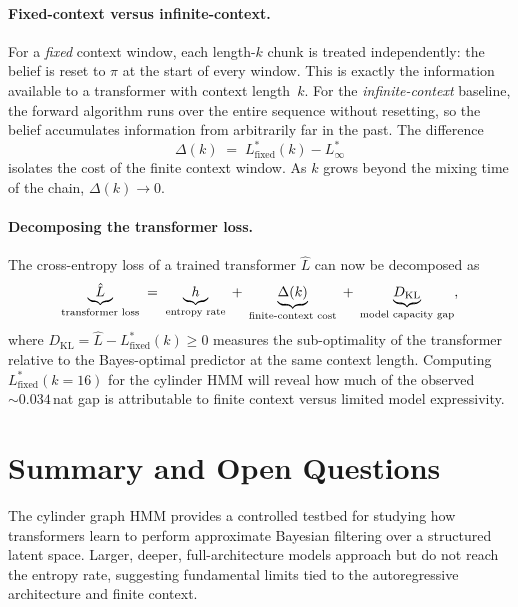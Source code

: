 \documentclass[11pt]{article}
\begin{document}
\paragraph{Fixed-context versus infinite-context.}
For a \emph{fixed} context window, each length-$k$ chunk is treated
independently: the belief is reset to $\pi$ at the start of every
window.  This is exactly the information available to a transformer with
context length~$k$.  For the \emph{infinite-context} baseline, the
forward algorithm runs over the entire sequence without resetting, so
the belief accumulates information from arbitrarily far in the past.
The difference
\begin{equation}
  \Delta(k) \;=\; L^{*}_{\text{fixed}}(k) - L^{*}_{\infty}
\end{equation}
isolates the cost of the finite context window.  As $k$ grows beyond the
mixing time of the chain, $\Delta(k) \to 0$.

\paragraph{Decomposing the transformer loss.}
The cross-entropy loss of a trained transformer $\hat{L}$ can now be
decomposed as
\begin{equation}
  \underbrace{\hat{L}}_{\text{transformer loss}}
  \;=\; \underbrace{h\vphantom{\hat{L}}}_{\text{entropy rate}}
  \;+\; \underbrace{\Delta(k)\vphantom{\hat{L}}}_{\text{finite-context cost}}
  \;+\; \underbrace{D_{\mathrm{KL}}\vphantom{\hat{L}}}_{\text{model capacity gap}},
\end{equation}
where $D_{\mathrm{KL}} = \hat{L} - L^{*}_{\text{fixed}}(k) \ge 0$
measures the sub-optimality of the transformer relative to the
Bayes-optimal predictor at the same context length.  Computing
$L^{*}_{\text{fixed}}(k{=}16)$ for the cylinder HMM will reveal how
much of the observed ${\sim}0.034$\,nat gap is attributable to finite
context versus limited model expressivity.

\section{Summary and Open Questions}

The cylinder graph HMM provides a controlled testbed for studying how
transformers learn to perform approximate Bayesian filtering over a
structured latent space.  Larger, deeper, full-architecture models
approach but do not reach the entropy rate, suggesting fundamental
limits tied to the autoregressive architecture and finite context.
\end{document}
